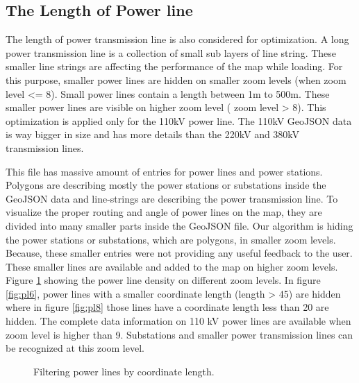 \subsection{The Length of Power line}

The length of power transmission line is also considered for optimization. A long power transmission line is a collection of small sub layers of line string. These smaller line strings are affecting the performance of the map while loading.  For this purpose, smaller power lines are hidden on smaller zoom levels (when zoom level <= 8).  Small power lines contain a length between 1m to 500m. These smaller power lines are visible on higher zoom level ( zoom level > 8). This optimization is applied only for the 110kV power line. The 110kV GeoJSON data is way bigger in size and has more details than the 220kV and 380kV transmission lines. 

This file has massive amount of entries for power lines and power stations. Polygons are describing mostly the power stations or substations inside the GeoJSON data and line-strings are describing the power transmission line. To visualize the proper routing and angle of power lines on the map, they are divided into many smaller parts inside the GeoJSON file. Our algorithm is hiding the power stations or substations, which are polygons, in smaller zoom levels. Because, these smaller entries were not providing any useful feedback to the user. These smaller lines are available and added to the map on higher zoom levels. Figure \ref{fig:plfilter} showing the power line density on different zoom levels. In figure \ref{fig:pl6}, power lines with a smaller coordinate length (length > 45) are hidden where in figure \ref{fig:pl8} those lines have a coordinate length less than 20 are hidden. The complete data information on 110 kV power lines are available when zoom level is higher than 9. Substations and smaller power transmission lines can be recognized at this zoom level. 

\begin{figure}
  \begin{center}
\hfill
{}
\hfill
\caption{Filtering power lines by coordinate length.}
\label{fig:plfilter}
\end{center}
\end{figure}

